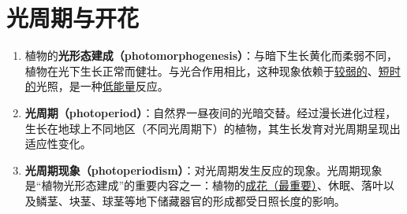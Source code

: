\chapter{光周期与开花}
\begin{enumerate}
    \item 植物的\textbf{光形态建成（photomorphogenesis）}：与暗下生长黄化而柔弱不同，植物在光下生长正常而健壮。与光合作用相比，这种现象依赖于\uline{较弱的}、\uline{短时的}光照，是一种\uline{低能量}反应。
    \item \textbf{光周期（photoperiod）}：自然界一昼夜间的光暗交替。经过漫长进化过程，生长在地球上不同地区（不同光周期下）的植物，其生长发育对光周期呈现出适应性变化。
    \item \textbf{光周期现象（photoperiodism）}：对光周期发生反应的现象。光周期现象是“植物光形态建成”的重要内容之一：植物的\uline{成花（最重要）}、休眠、落叶以及鳞茎、块茎、球茎等地下储藏器官的形成都受日照长度的影响。
\end{enumerate}

